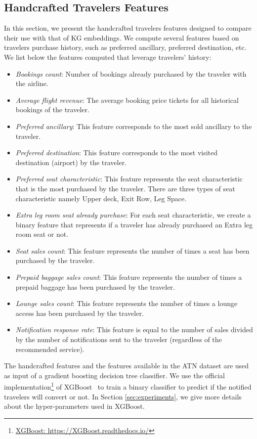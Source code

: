 \documentclass[11pt,dvipdfm]{article}
\begin{document}
\subsection{Handcrafted Travelers Features}
\label{subsec:handcrafted}
In this section, we present the handcrafted travelers features designed to compare their use with that of KG embeddings. We compute several features based on travelers purchase history, such as preferred ancillary, preferred destination, etc. We list below the features computed that leverage travelers' history:
\begin{itemize}
    \item \textit{Bookings count}: Number of bookings already purchased by the traveler with the airline.
    \item \textit{Average flight revenue}: The average booking price tickets for all historical bookings of the traveler.
    \item \textit{Preferred ancillary}: This feature corresponds to the most sold ancillary to the traveler.
    \item \textit{Preferred destination}: This feature corresponds to the most visited destination (airport) by the traveler.
    \item \textit{Preferred seat characteristic}: This feature represents the seat characteristic that is the most purchased by the traveler. There are three types of seat characteristic namely Upper deck, Exit Row, Leg Space. 
    \item \textit{Extra leg room seat already purchase}: For each seat characteristic, we create a binary feature that represents if a traveler has already purchased an Extra leg room seat or not.
    \item \textit{Seat sales count}: This feature represents the number of times a seat has been purchased by the traveler.
    \item \textit{Prepaid baggage sales count}: This feature represents the number of times a prepaid baggage has been purchased by the traveler.
    \item \textit{Lounge sales count}: This feature represents the number of times a lounge access has been purchased by the traveler.
    \item \textit{Notification response rate}: This feature is equal to the number of sales divided by the number of notifications sent to the traveler (regardless of the recommended service).
\end{itemize}

The handcrafted features and the features available in the ATN dataset are used as input of a gradient boosting decision tree classifier. We use the official implementation\footnote{\url{XGBoost: https://XGBoost.readthedocs.io/}} of XGBoost~\cite{Chen16} to train a binary classifier to predict if the notified travelers will convert or not. In Section \ref{sec:experiments}, we give more details about the hyper-parameters used in XGBoost.
\end{document}
